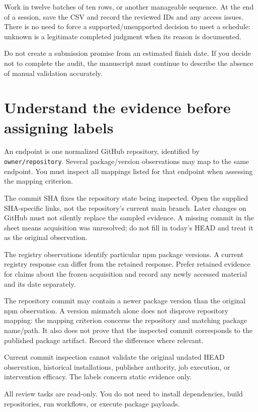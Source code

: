 \documentclass[11pt,a4paper]{article}
\begin{document}
Work in twelve batches of ten rows, or another manageable sequence. At the end of a session, save the CSV and record the reviewed IDs and any access issues. There is no need to force a supported/unsupported decision to meet a schedule: unknown is a legitimate completed judgment when its reason is documented.


Do not create a submission promise from an estimated finish date. If you decide not to complete the audit, the manuscript must continue to describe the absence of manual validation accurately.


\section{Understand the evidence before assigning labels}


An endpoint is one normalized GitHub repository, identified by \nolinkurl{owner/repository}. Several package/version observations may map to the same endpoint. You must inspect all mappings listed for that endpoint when assessing the mapping criterion.


The commit SHA fixes the repository state being inspected. Open the supplied SHA-specific links, not the repository's current main branch. Later changes on GitHub must not silently replace the sampled evidence. A missing commit in the sheet means acquisition was unresolved; do not fill in today's HEAD and treat it as the original observation.


The registry observations identify particular npm package versions. A current registry response can differ from the retained response. Prefer retained evidence for claims about the frozen acquisition and record any newly accessed material and its date separately.


The repository commit may contain a newer package version than the original npm observation. A version mismatch alone does not disprove repository mapping: the mapping criterion concerns the repository and matching package name/path. It also does not prove that the inspected commit corresponds to the published package artifact. Record the difference where relevant.


Current commit inspection cannot validate the original undated HEAD observation, historical installations, publisher authority, job execution, or intervention efficacy. The labels concern static evidence only.


All review tasks are read-only. You do not need to install dependencies, build repositories, run workflows, or execute package payloads.
\end{document}
